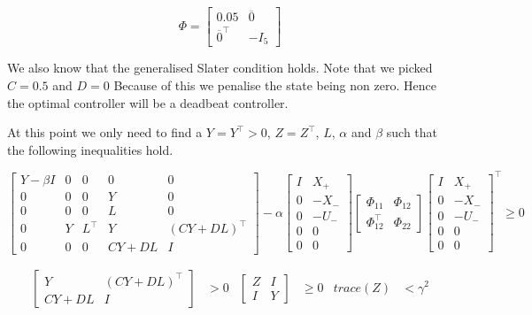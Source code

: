 \begin{equation*}
\Phi = \begin{bmatrix} 0.05 & \overline{0} \\ \overline{0}^\top & -I_5 \end{bmatrix}
\end{equation*}

We also know that the generalised Slater condition holds. Note that we picked $C = 0.5$ and $D=0$ Because of this we penalise the state being non zero. Hence the optimal controller will be a deadbeat controller. 

At this point we only need to find a $Y = Y^\top > 0$, $Z = Z^\top$, $L$, $\alpha$ and $\beta$ such that the following inequalities hold.

\begin{equation*}
	\begin{bmatrix}
		Y - \beta I & 0 & 0 & 0 & 0 \\
		0 & 0 & 0 & Y & 0 \\
		0 & 0 & 0 & L & 0 \\
		0 & Y & L^\top & Y & (CY + DL)^\top \\
		0 & 0 & 0 & CY + DL & I 
	\end{bmatrix} - \alpha
	\begin{bmatrix} I&X_+ \\ 0 & -X_- \\ 0&-U_- \\ 0&0 \\ 0&0 \end{bmatrix}
	\begin{bmatrix} \Phi_{11} & \Phi_{12} \\ \Phi_{12}^\top & \Phi_{22} \end{bmatrix}
	\begin{bmatrix} I&X_+ \\ 0 & -X_- \\ 0&-U_- \\ 0&0 \\ 0&0 \end{bmatrix}^\top \geq 0
\end{equation*}

\begin{align*}
	\begin{bmatrix} Y & (CY + DL)^\top \\ CY + DL & I \end{bmatrix} &> 0 &
	\begin{bmatrix} Z & I \\ I & Y \end{bmatrix} &\geq 0 &
	trace(Z) &< \gamma^2
\end{align*}


